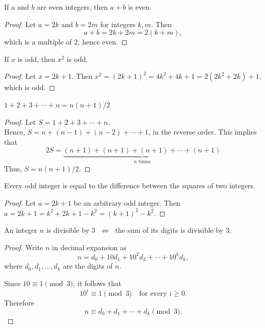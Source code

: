 \begin{theorem}\label{thm:even+even}
If \(a\) and \(b\) are even integers, then \(a+b\) is even.
\end{theorem}
\begin{proof}
Let \(a=2k\) and \(b=2m\) for integers \(k,m\). Then
\[
a+b=2k+2m=2(k+m),
\]
which is a multiple of \(2\), hence even.
\end{proof}

\begin{theorem}
If \(x\) is odd, then \(x^2\) is odd.
\end{theorem}
\begin{proof}
Let \(x=2k+1\). Then \(x^2=(2k+1)^2=4k^2+4k+1=2(2k^2+2k)+1\), which is odd.
\end{proof}

\begin{theorem}
$1 + 2 + 3 + \cdots + n  = n(n+1)/2$
\end{theorem}
\begin{proof}
Let $S = 1 + 2 + 3 + \cdots + n$. \\
Hence,  $S = n + (n-1) + (n-2) + \cdots + 1$,  in the reverse order. This implies that 
\[
2S = \underbrace{(n+1) + (n+1) + (n+1) + \cdots + (n+1)}_{\mbox{$n$ times}}
\]
Thus, $S = n(n+1)/2$.
\end{proof}

\begin{theorem}
Every odd integer is equal to the diﬀerence between the squares of two integers.
\end{theorem}
\begin{proof}
Let $a = 2k+1$ be an arbitrary odd integer. Then $a = 2k + 1 = k^2 + 2k + 1 -k^2 = (k+1)^2 - k^2$.
\end{proof}

\begin{theorem}
An integer $n$ is divisible by $3$ $\;\Longleftrightarrow\;$ the sum of its digits is divisible by $3$.
\end{theorem}

\begin{proof}
Write $n$ in decimal expansion as
\[
n = d_0 + 10d_1 + 10^2 d_2 + \cdots + 10^k d_k,
\]
where $d_0, d_1, \dots, d_k$ are the digits of $n$.

Since $10 \equiv 1 \pmod{3}$, it follows that
\[
10^i \equiv 1 \pmod{3} \quad \text{for every } i \geq 0.
\]
Therefore
\[
n \equiv d_0 + d_1 + \cdots + d_k \pmod{3}.
\]

%
\end{proof}


